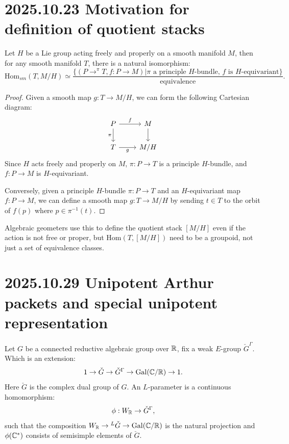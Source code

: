 \documentclass[12pt]{amsart}
\numberwithin{equation}{section}
\begin{document}



\section{2025.10.23 Motivation for definition of quotient stacks}

\begin{lem}
  Let $H$ be a Lie group acting freely and properly on a smooth manifold $M$, then for any smooth manifold $T$, there is a natural isomorphism:
  \[\mathrm{Hom}_{sm}(T,M/H) \simeq \frac{\{( P \to^\pi T,f: P \to M)|\textrm{$\pi$ a principle $H$-bundle, $f$ is $H$-equivariant}\}}{\textrm{equivalence}}.\]
\end{lem}

\begin{proof}
  Given a smooth map $g : T \to M/H$, we can form the following Cartesian diagram:
  \[
  \begin{tikzcd}
    P \arrow[r,"f"] \arrow[d,"\pi"'] & M \arrow[d] \\
    T \arrow[r,"g"'] & M/H
  \end{tikzcd}
  \]
  Since $H$ acts freely and properly on $M$, $\pi : P \to T$ is a principle $H$-bundle, and $f : P \to M$ is $H$-equivariant.

  Conversely, given a principle $H$-bundle $\pi : P \to T$ and an $H$-equivariant map $f : P \to M$, we can define a smooth map $g : T \to M/H$ by sending $t \in T$ to the orbit of $f(p)$ where $p \in \pi^{-1}(t)$.
\end{proof}

\begin{rk}
  Algebraic geometers use this to define the quotient stack $[M/H]$ even if the action is not free or proper, but $\mathrm{Hom}(T,[M/H])$ need to be a groupoid, not just a set of equivalence classes.
\end{rk}



\section{2025.10.29 Unipotent Arthur packets and special unipotent representation \cite{ABV92}}


Let $G$ be a connected reductive algebraic group over ${\mathbb {R}}$, fix a weak $E$-group $\check{G}^{\Gamma}$. Which is an extension:
\[1 \to \check{G} \to {\check{G}^{\Gamma}} \to \mathrm{Gal}({\mathbb {C}}/{\mathbb {R}}) \to 1.\]
Here $\check{G}$ is the complex dual group of $G$.
An $L$-parameter is a continuous homomorphism:
\[\phi : W_{{\mathbb {R}}} \to {\check{G}^{\Gamma}},\]
such that the composition $W_{{\mathbb {R}}} \to {^{L}\check{G}} \to \mathrm{Gal}({\mathbb {C}}/{\mathbb {R}})$ is the natural projection and $\phi({\mathbb {C}}^*)$ consists of semisimple elements of $\check{G}$.
\end{document}
